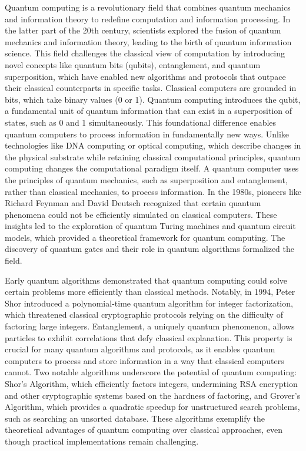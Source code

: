 \documentclass[11pt]{article}
\theoremstyle{definition}
\begin{document}
Quantum computing is a revolutionary field that combines quantum mechanics and information theory to redefine computation and information processing. In the latter part of the 20th century, scientists explored the fusion of quantum mechanics and information theory, leading to the birth of quantum information science. This field challenges the classical view of computation by introducing novel concepts like quantum bits (qubits), entanglement, and quantum superposition, which have enabled new algorithms and protocols that outpace their classical counterparts in specific tasks. Classical computers are grounded in bits, which take binary values (0 or 1). Quantum computing introduces the qubit, a fundamental unit of quantum information that can exist in a superposition of states, such as 0 and 1 simultaneously. This foundational difference enables quantum computers to process information in fundamentally new ways. Unlike technologies like DNA computing or optical computing, which describe changes in the physical substrate while retaining classical computational principles, quantum computing changes the computational paradigm itself. A quantum computer uses the principles of quantum mechanics, such as superposition and entanglement, rather than classical mechanics, to process information. In the 1980s, pioneers like Richard Feynman and David Deutsch recognized that certain quantum phenomena could not be efficiently simulated on classical computers. These insights led to the exploration of quantum Turing machines and quantum circuit models, which provided a theoretical framework for quantum computing. The discovery of quantum gates and their role in quantum algorithms formalized the field.

Early quantum algorithms demonstrated that quantum computing could solve certain problems more efficiently than classical methods. Notably, in 1994, Peter Shor introduced a polynomial-time quantum algorithm for integer factorization, which threatened classical cryptographic protocols relying on the difficulty of factoring large integers. Entanglement, a uniquely quantum phenomenon, allows particles to exhibit correlations that defy classical explanation. This property is crucial for many quantum algorithms and protocols, as it enables quantum computers to process and store information in a way that classical computers cannot. Two notable algorithms underscore the potential of quantum computing: Shor’s Algorithm, which efficiently factors integers, undermining RSA encryption and other cryptographic systems based on the hardness of factoring, and Grover’s Algorithm, which provides a quadratic speedup for unstructured search problems, such as searching an unsorted database. These algorithms exemplify the theoretical advantages of quantum computing over classical approaches, even though practical implementations remain challenging.
\end{document}
